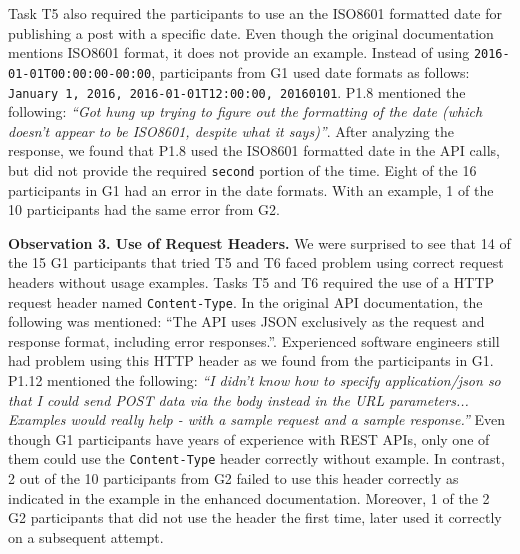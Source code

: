 Task T5 also required the participants to use an the ISO8601 formatted date for publishing a post with a specific date. Even though the original documentation mentions ISO8601 format, it does not provide an example. Instead of using \lstinline{2016-01-01T00:00:00-00:00}, participants from G1 used date formats as follows: \lstinline{January 1, 2016, 2016-01-01T12:00:00, 20160101}. P1.8 mentioned the following: \textit{``Got hung up trying to figure out the formatting of the date (which doesn't appear to be ISO8601, despite what it says)''}. After analyzing the response, we found that P1.8 used the ISO8601 formatted date in the API calls, but did not provide the required \lstinline{second} portion of the time. Eight of the 16 participants in G1 had an error in the date formats. With an example, 1 of the 10 participants had the same error from G2.

\vspace{10mm}
\hspace{-5mm}
\vspace{10mm}

\textbf{Observation 3. Use of Request Headers.} We were surprised to see that 14 of the 15 G1 participants that tried T5 and T6 faced problem using correct request headers without usage examples. Tasks T5 and T6 required the use of a HTTP request header named \lstinline{Content-Type}. In the original API documentation, the following was mentioned: ``The API uses JSON exclusively as the request and response format, including error responses.''. Experienced software engineers still had problem using this HTTP header as we found from the participants in G1. P1.12 mentioned the following: \textit{``I didn't know how to specify application/json so that I could send POST data via the body instead in the URL parameters... Examples would really help - with a sample request and a sample response.''}  Even though G1 participants have years of experience with REST APIs, only one of them could use the \lstinline{Content-Type} header correctly without example. In contrast, 2 out of the 10 participants from G2 failed to use this header correctly as indicated in the example in the enhanced documentation. Moreover, 1 of the 2 G2 participants that did not use the header the first time, later used it correctly on a subsequent attempt.

